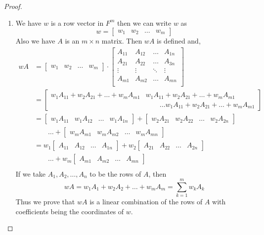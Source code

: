 \documentclass[12pt, a4paper]{article}
\theoremstyle{definition}
\theoremstyle{remark}
\begin{document}
\begin{proof}
\begin{enumerate}
        \item We have $w$ is a row vector in $F^m$ then we can write $w$ as \[
        w = \begin{bmatrix}
            w_1 & w_2 & \ldots & w_m
        \end{bmatrix}
        \]
        Also we have $A$ is an $m \times n$ matrix. Then $wA$ is defined and,
        \begin{align*}
            wA &= \begin{bmatrix}
                w_1 & w_2 & \ldots & w_m
            \end{bmatrix} \cdot \begin{bmatrix}
                A_{11} & A_{12} & \ldots & A_{1n} \\
                A_{21} & A_{22} & \ldots & A_{3n} \\
                \vdots & \vdots & \ddots & \vdots \\
                A_{m1} & A_{m2} & \ldots & A_{mn} \\
            \end{bmatrix} \\
            &= \begin{bmatrix}
                w_1A_{11}+w_2A_{21}+\ldots+w_mA_{m1} & w_1A_{11}+w_2A_{21}+\ldots+w_mA_{m1} \\ & \quad \quad  \ldots w_1A_{11}+w_2A_{21}+\ldots+w_mA_{m1}
            \end{bmatrix}\\
            &= \begin{bmatrix}
                w_1A_{11} & w_1A_{12} & \ldots & w_1A_{1n}
            \end{bmatrix} + \begin{bmatrix}
                w_2A_{21} & w_2A_{22} & \ldots & w_2A_{2n}
            \end{bmatrix} \\
            & \quad \quad \ldots + \begin{bmatrix}
                w_mA_{m1} & w_mA_{m2} & \ldots & w_mA_{mn}
            \end{bmatrix} \\
            &= w_1\begin{bmatrix}
                A_{11} & A_{12} & \ldots & A_{1n}
            \end{bmatrix} + w_2\begin{bmatrix}
                A_{21} & A_{22} & \ldots & A_{2n}
            \end{bmatrix} \\
            & \quad \quad \ldots + w_m\begin{bmatrix}
                A_{m1} & A_{m2} & \ldots & A_{mn}
            \end{bmatrix} \\
        \end{align*}
        If we take $A_1,A_2, \dots, A_n$ to be the rows of $A$, then
        \[
        wA = w_1A_1+w_2A_2+\ldots+w_mA_m = \sum_{k=1}^mw_kA_k
        \]
        Thus we prove that $wA$ is a linear combination of the rows of $A$ with coefficients being the coordinates of $w$.


\end{enumerate}
\end{proof}
\end{document}

